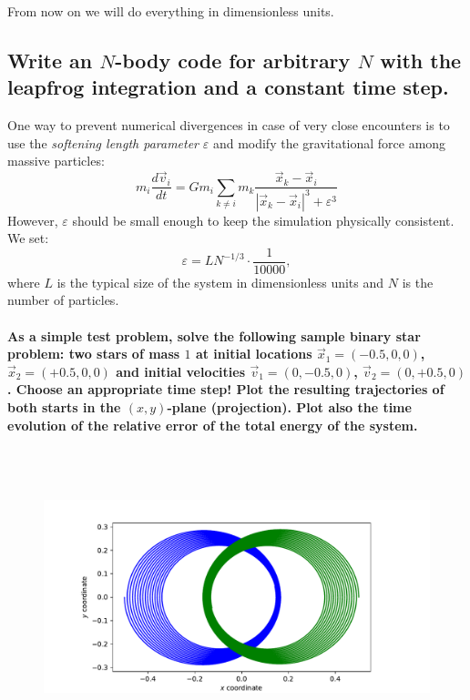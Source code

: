     
    From now on we will do everything in dimensionless units.

\newpage
\subsection{Write an $N$-body code for arbitrary $N$ with the leapfrog 
    integration and a constant time step.
} 
    One way to prevent numerical divergences in case of very close encounters 
    is to use the \textit{softening length parameter} $\varepsilon$ and modify 
    the gravitational force among massive particles:
    \begin{equation}
        m_i\frac{d\vec v_i}{dt}
        =Gm_i\sum_{k\neq i}m_k\frac{\vec x_k-\vec x_i}
        {|\vec x_k-\vec x_i|^3 + \varepsilon^3}
    \end{equation}
    However, $\varepsilon$ should be small enough to keep the simulation 
    physically consistent. We set:
    \begin{equation}
        \varepsilon=LN^{-1/3}\cdot\frac{1}{10000},
    \end{equation}
    where $L$ is the typical size of the system in dimensionless units and 
    $N$ is the number of particles.

    \paragraph{As a simple test problem, solve the following sample binary 
        star problem: two stars of mass $1$ at initial locations 
        $\vec x_1=(-0.5,0,0)$, $\vec x_2=(+0.5,0,0)$ and initial velocities
        $\vec v_1=(0,-0.5,0)$, $\vec v_2=(0,+0.5,0)$. Choose an appropriate
        time step! Plot the resulting trajectories of both starts in the 
        $(x,y)$-plane (projection). Plot also the time evolution of the 
        relative error of the total energy of the system.
    } \ \\
        \\
        \begin{figure}[h!]
            \centering
            \includegraphics[width=\textwidth]{./figures/task2_2body.pdf}
            \caption{}
        \end{figure} \ \\ 

